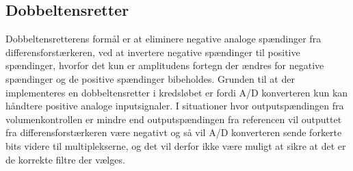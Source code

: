 \subsection{Dobbeltensretter}
\label{Dobbeltensretter}
%
Dobbeltensretterens formål er at eliminere negative analoge spændinger fra differensforstærkeren, ved at invertere negative spændinger til positive spændinger, hvorfor det kun er amplitudens fortegn der ændres for negative spændinger og de positive spændinger bibeholdes. Grunden til at der implementeres en dobbeltensretter i kredsløbet er fordi A/D konverteren kun kan håndtere positive analoge inputsignaler. I situationer hvor outputspændingen fra volumenkontrollen er mindre end outputspændingen fra referencen vil outputtet fra differensforstærkeren være negativt og så vil A/D konverteren sende forkerte bits videre til multiplekserne, og det vil derfor ikke være muligt at sikre at det er de korrekte filtre der vælges. 

